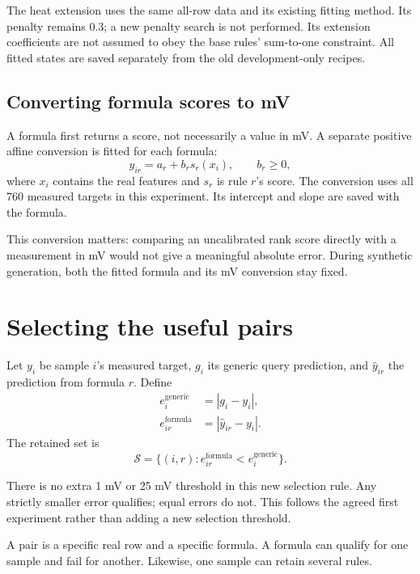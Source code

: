 \documentclass[11pt]{article}
\begin{document}
The heat extension uses the same all-row data and its existing fitting method.
Its penalty remains 0.3; a new penalty search is not performed. Its extension
coefficients are not assumed to obey the base rules' sum-to-one constraint.
All fitted states are saved separately from the old development-only recipes.

\subsection{Converting formula scores to mV}
A formula first returns a score, not necessarily a value in mV. A separate
positive affine conversion is fitted for each formula:
\begin{equation}
 \widehat y_{ir}=a_r+b_r s_r(x_i),\qquad b_r\geq 0,
\end{equation}
where $x_i$ contains the real features and $s_r$ is rule $r$'s score. The
conversion uses all 760 measured targets in this experiment. Its intercept and
slope are saved with the formula.

This conversion matters: comparing an uncalibrated rank score directly with a
measurement in mV would not give a meaningful absolute error. During synthetic
generation, both the fitted formula and its mV conversion stay fixed.

\section{Selecting the useful pairs}
Let $y_i$ be sample $i$'s measured target, $g_i$ its generic query prediction,
and $\widehat y_{ir}$ the prediction from formula $r$. Define
\begin{align}
 e_i^{\mathrm{generic}} &= |g_i-y_i|,\\
 e_{ir}^{\mathrm{formula}} &= |\widehat y_{ir}-y_i|.
\end{align}
The retained set is
\begin{equation}
 \mathcal{S}=\{(i,r):e_{ir}^{\mathrm{formula}}<e_i^{\mathrm{generic}}\}.
\end{equation}

There is no extra 1 mV or 25 mV threshold in this new selection rule. Any strictly
smaller error qualifies; equal errors do not. This follows the agreed first
experiment rather than adding a new selection threshold.

A pair is a specific real row and a specific formula. A formula can qualify for
one sample and fail for another. Likewise, one sample can retain several rules.
\end{document}
